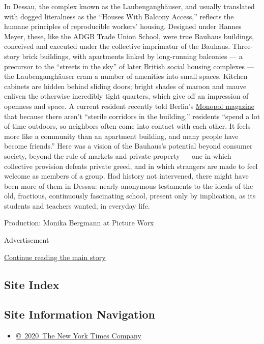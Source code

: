 In Dessau, the complex known as the Laubenganghäuser, and usually
translated with dogged literalness as the ``Houses With Balcony
Access,'' reflects the humane principles of reproducible workers'
housing. Designed under Hannes Meyer, these, like the ADGB Trade Union
School, were true Bauhaus buildings, conceived and executed under the
collective imprimatur of the Bauhaus. Three-story brick buildings, with
apartments linked by long-running balconies --- a precursor to the
``streets in the sky'' of later British social housing complexes --- the
Laubenganghäuser cram a number of amenities into small spaces. Kitchen
cabinets are hidden behind sliding doors; bright shades of maroon and
mauve enliven the otherwise incredibly tight quarters, which give off an
impression of openness and space. A current resident recently told
Berlin's \href{https://www.monopol-magazin.de/}{Monopol magazine} that
because there aren't ``sterile corridors in the building,'' residents
``spend a lot of time outdoors, so neighbors often come into contact
with each other. It feels more like a community than an apartment
building, and many people have become friends.'' Here was a vision of
the Bauhaus's potential beyond consumer society, beyond the rule of
markets and private property --- one in which collective provision
defeats private greed, and in which strangers are made to feel welcome
as members of a group. Had history not intervened, there might have been
more of them in Dessau: nearly anonymous testaments to the ideals of the
old, fractious, continuously fascinating school, present only by
implication, as its students and teachers wanted, in everyday life.

Production: Monika Bergmann at Picture Worx

Advertisement

\protect\hyperlink{after-bottom}{Continue reading the main story}

\hypertarget{site-index}{%
\subsection{Site Index}\label{site-index}}

\hypertarget{site-information-navigation}{%
\subsection{Site Information
Navigation}\label{site-information-navigation}}

\begin{itemize}
\tightlist
\item
  \href{https://help.nytimes3xbfgragh.onion/hc/en-us/articles/115014792127-Copyright-notice}{©~2020~The
  New York Times Company}
\end{itemize}

